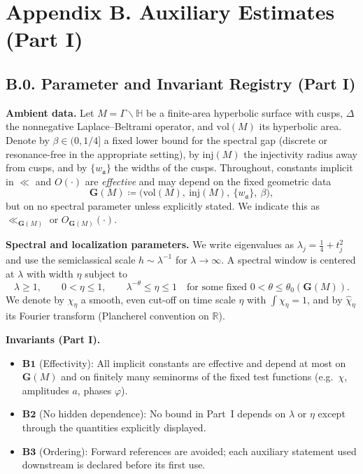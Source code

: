 \section*{Appendix B. Auxiliary Estimates (Part I)}

\subsection*{B.0. Parameter and Invariant Registry (Part I)}
\noindent\textbf{Ambient data.}
Let \(M=\Gamma\backslash\mathbb{H}\) be a finite-area hyperbolic surface with cusps, \(\Delta\) the nonnegative Laplace–Beltrami operator, and \(\mathrm{vol}(M)\) its hyperbolic area. Denote by \(\beta\in(0,1/4]\) a fixed lower bound for the spectral gap (discrete or resonance-free in the appropriate setting), by \(\mathrm{inj}(M)\) the injectivity radius away from cusps, and by \(\{w_{\mathfrak a}\}\) the widths of the cusps. Throughout, constants implicit in \(\ll\) and \(O(\cdot)\) are \emph{effective} and may depend on the fixed geometric data
\[
\mathbf{G}(M)\coloneqq\Big(\mathrm{vol}(M),\ \mathrm{inj}(M),\ \{w_{\mathfrak a}\},\ \beta\Big),
\]
but on no spectral parameter unless explicitly stated. We indicate this as \(\ll_{\mathbf{G}(M)}\) or \(O_{\mathbf{G}(M)}(\cdot)\).

\smallskip
\noindent\textbf{Spectral and localization parameters.}
We write eigenvalues as \(\lambda_j = \tfrac14+t_j^2\) and use the semiclassical scale \(h\sim \lambda^{-1}\) for \(\lambda\to\infty\). A spectral window is centered at \(\lambda\) with width \(\eta\) subject to
\[
\lambda\ge 1,\qquad 0<\eta\le 1,\qquad \lambda^{-\theta}\le \eta\le 1\quad\text{for some fixed }0<\theta\le \theta_0(\mathbf{G}(M)).
\]
We denote by \(\chi_\eta\) a smooth, even cut-off on time scale \(\eta\) with \(\int\chi_\eta=1\), and by \(\widehat{\chi}_\eta\) its Fourier transform (Plancherel convention on \(\mathbb{R}\)).

\smallskip
\noindent\textbf{Invariants (Part I).}
\begin{itemize}
  \item \(\mathbf{B1}\) (Effectivity): All implicit constants are effective and depend at most on \(\mathbf{G}(M)\) and on finitely many seminorms of the fixed test functions (e.g.\ \(\chi\), amplitudes \(a\), phases \(\varphi\)).
  \item \(\mathbf{B2}\) (No hidden dependence): No bound in Part~I depends on \(\lambda\) or \(\eta\) except through the quantities explicitly displayed.
  \item \(\mathbf{B3}\) (Ordering): Forward references are avoided; each auxiliary statement used downstream is declared before its first use.
\end{itemize}

